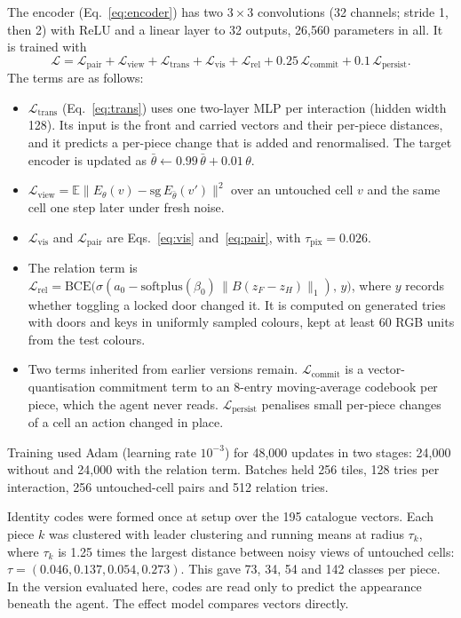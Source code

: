 \documentclass{article}
\begin{document}
The encoder (Eq.~\ref{eq:encoder}) has two $3\times3$ convolutions (32 channels; stride 1, then 2) with ReLU and a linear layer to 32 outputs, 26,560 parameters in all. It is trained with
\begin{equation} \label{eq:enc_total}
    \mathcal{L} = \mathcal{L}_{\text{pair}} + \mathcal{L}_{\text{view}} + \mathcal{L}_{\text{trans}} + \mathcal{L}_{\text{vis}} + \mathcal{L}_{\text{rel}} + 0.25\,\mathcal{L}_{\text{commit}} + 0.1\,\mathcal{L}_{\text{persist}}.
\end{equation}
The terms are as follows:
\begin{itemize}
    \item $\mathcal{L}_{\text{trans}}$ (Eq.~\ref{eq:trans}) uses one two-layer MLP per interaction (hidden width 128). Its input is the front and carried vectors and their per-piece distances, and it predicts a per-piece change that is added and renormalised. The target encoder is updated as $\bar\theta\gets0.99\,\bar\theta+0.01\,\theta$.
    \item $\mathcal{L}_{\text{view}}=\mathbb{E}\|E_\theta(v)-\mathrm{sg}\,E_{\bar\theta}(v')\|^2$ over an untouched cell $v$ and the same cell one step later under fresh noise.
    \item $\mathcal{L}_{\text{vis}}$ and $\mathcal{L}_{\text{pair}}$ are Eqs.~\eqref{eq:vis} and~\eqref{eq:pair}, with $\tau_{\text{pix}}=0.026$.
    \item The relation term is $\mathcal{L}_{\text{rel}}=\mathrm{BCE}\big(\sigma(a_0-\mathrm{softplus}(\beta_0)\,\|B(z_F-z_H)\|_1),\,y\big)$, where $y$ records whether toggling a locked door changed it. It is computed on generated tries with doors and keys in uniformly sampled colours, kept at least 60 RGB units from the test colours.
    \item Two terms inherited from earlier versions remain. $\mathcal{L}_{\text{commit}}$ is a vector-quantisation commitment term \cite{vandenOord2017} to an 8-entry moving-average codebook per piece, which the agent never reads. $\mathcal{L}_{\text{persist}}$ penalises small per-piece changes of a cell an action changed in place.
\end{itemize}
Training used Adam (learning rate $10^{-3}$) for 48,000 updates in two stages: 24,000 without and 24,000 with the relation term. Batches held 256 tiles, 128 tries per interaction, 256 untouched-cell pairs and 512 relation tries.

Identity codes were formed once at setup over the 195 catalogue vectors. Each piece $k$ was clustered with leader clustering and running means at radius $\tau_k$, where $\tau_k$ is 1.25 times the largest distance between noisy views of untouched cells: $\tau=(0.046, 0.137, 0.054, 0.273)$. This gave 73, 34, 54 and 142 classes per piece. In the version evaluated here, codes are read only to predict the appearance beneath the agent. The effect model compares vectors directly.
\end{document}
